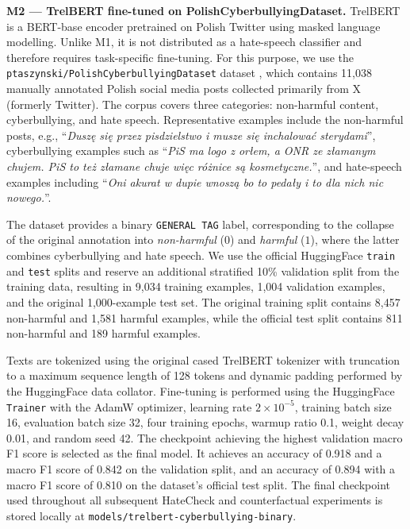 \documentclass[11pt,a4paper]{article}
\begin{document}
\textbf{M2 --- TrelBERT fine-tuned on PolishCyberbullyingDataset.}
TrelBERT \citep[HuggingFace ID \texttt{deepsense-ai/trelbert};][]{Szmyd2023} is a BERT-base encoder pretrained on Polish Twitter using masked language modelling. Unlike M1, it is not distributed as a hate-speech classifier and therefore requires task-specific fine-tuning. For this purpose, we use the \texttt{ptaszynski/PolishCyberbullyingDataset} dataset \citep{Ptaszynski2024}, which contains 11,038 manually annotated Polish social media posts collected primarily from X (formerly Twitter). The corpus covers three categories: non-harmful content, cyberbullying, and hate speech. Representative examples include the non-harmful posts, e.g., ``\emph{Duszę się przez pisdzielstwo i musze się inchalować sterydami}'', cyberbullying examples such as ``\emph{PiS ma logo z orłem, a ONR ze złamanym chujem. PiS to też złamane chuje więc różnice są kosmetyczne.}'', and hate-speech examples including ``\emph{Oni akurat w dupie wnoszą bo to pedały i to dla nich nic nowego.}''.

The dataset provides a binary \texttt{GENERAL TAG} label, corresponding to the collapse of the original annotation into \textit{non-harmful} ($0$) and \textit{harmful} ($1$), where the latter combines cyberbullying and hate speech. We use the official HuggingFace \texttt{train} and \texttt{test} splits and reserve an additional stratified 10\% validation split from the training data, resulting in 9,034 training examples, 1,004 validation examples, and the original 1,000-example test set. The original training split contains 8,457 non-harmful and 1,581 harmful examples, while the official test split contains 811 non-harmful and 189 harmful examples.

Texts are tokenized using the original cased TrelBERT tokenizer with truncation to a maximum sequence length of 128 tokens and dynamic padding performed by the HuggingFace data collator. Fine-tuning is performed using the HuggingFace \texttt{Trainer} with the AdamW optimizer, learning rate $2 \times 10^{-5}$, training batch size 16, evaluation batch size 32, four training epochs, warmup ratio 0.1, weight decay 0.01, and random seed 42. The checkpoint achieving the highest validation macro F1 score is selected as the final model. It achieves an accuracy of 0.918 and a macro F1 score of 0.842 on the validation split, and an accuracy of 0.894 with a macro F1 score of 0.810 on the dataset's official test split. The final checkpoint used throughout all subsequent HateCheck and counterfactual experiments is stored locally at \texttt{models/trelbert-cyberbullying-binary}.
\end{document}
